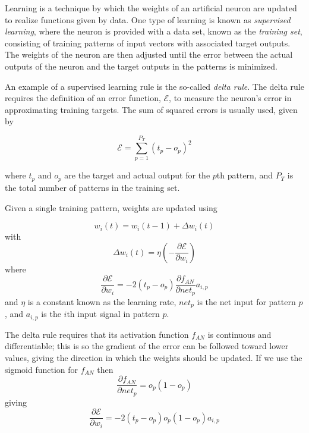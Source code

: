 \documentclass[master]{outhesis}
\begin{document}
Learning is a technique by which the weights of an artificial neuron are updated to realize functions given by data.
One type of learning is known as \emph{supervised learning}, where the neuron is provided with a data set, known as the \emph{training set}, consisting of training patterns of input vectors with associated target outputs.
The weights of the neuron are then adjusted until the error between the actual outputs of the neuron and the target outputs in the patterns is minimized.

An example of a supervised learning rule is the so-called \emph{delta rule}.
The delta rule requires the definition of an error function, $\mathcal{E}$, to measure the neuron's error in approximating training targets.
The sum of squared errors is usually used, given by

\begin{displaymath}
\mathcal{E} = \sum_{p=1}^{P_T}(t_p-o_p)^2
\end{displaymath}

where $t_p$ and $o_p$ are the target and actual output for the $p$th pattern, and $P_T$ is the total number of patterns in the training set.

Given a single training pattern, weights are updated using

\begin{displaymath}
w_i(t) = w_i(t - 1) + \Delta w_i(t)
\end{displaymath}
with
\begin{displaymath}
\Delta w_i(t) = \eta(- \frac{\partial \mathcal{E}}{\partial w_i})
\end{displaymath}
where
\begin{displaymath}
\frac{\partial \mathcal{E}}{\partial w_i} = -2(t_p - o_p)\frac{\partial f_{AN}}{\partial net_p}a_{i,p}
\end{displaymath}
and $\eta$ is a constant known as the learning rate, $net_p$ is the net input for pattern $p$, and $a_{i,p}$ is the $i$th input signal in pattern $p$.

The delta rule requires that its activation function $f_{AN}$ is continuous and differentiable;
this is so the gradient of the error can be followed toward lower values, giving the direction in which the weights should be updated.
If we use the sigmoid function for $f_{AN}$ then
\begin{displaymath}
\frac{\partial f_{AN}}{\partial net_p} = o_p(1 - o_p)
\end{displaymath}
giving
\begin{displaymath}
\frac{\partial \mathcal{E}}{\partial w_i} = -2(t_p - o_p)o_p(1 - o_p)a_{i,p}
\end{displaymath}
\end{document}
